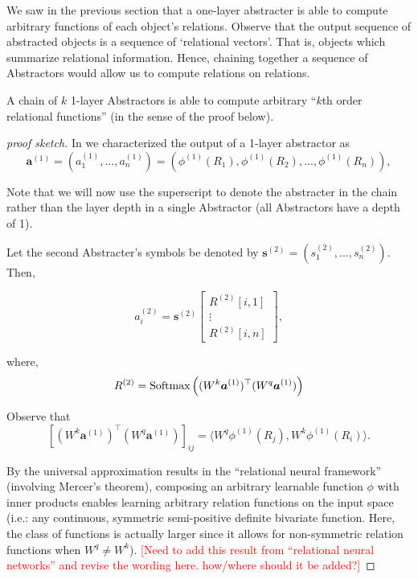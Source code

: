 We saw in the previous section that a one-layer abstracter is able to compute arbitrary functions  of each object's relations. Observe that the output sequence of abstracted objects is a sequence of `relational vectors'. That is, objects which summarize relational information. Hence, chaining together a sequence of Abstractors would allow us to compute relations on relations. 

\begin{lemma}
	\label{lemma:function_class_composed_abstractors}
	A chain of $k$ 1-layer Abstractors is able to compute arbitrary ``$k$th order relational functions'' (in the sense of the proof below).
\end{lemma}
\begin{proof}[proof sketch]
	In  we characterized the output of a 1-layer abstractor as
	\begin{equation*}
		\boldsymbol{a}^{(1)} = (a_1^{(1)}, ..., a_n^{(1)}) = \left(\phi^{(1)}(R_1), \phi^{(1)}(R_2), ..., \phi^{(1)}(R_n)\right),
	\end{equation*}
	
	Note that we will now use the superscript to denote the abstracter in the chain rather than the layer depth in a single Abstractor (all Abstractors have a depth of 1). 
	
	Let the second Abstracter's symbols be denoted by $\boldsymbol{s}^{(2)} = (s_1^{(2)}, ..., s_n^{(2)})$. Then, 
	
	\begin{equation*}
		a_i^{(2)} = \boldsymbol{s}^{(2)} \begin{bmatrix}R^{(2)}[i,1] \\ \vdots \\ R^{(2)}[i,n]\end{bmatrix},
	\end{equation*}
	
	where,
	\begin{equation*}
		R^{(2)} = \Softmax\left((W^k \boldsymbol{a}^{(1)})^\top (W^q \boldsymbol{a}^{(1)})\right)
	\end{equation*}
	
	Observe that 
	\begin{equation*}
		\left[(W^k \boldsymbol{a}^{(1)})^\top (W^q \boldsymbol{a}^{(1)})\right]_{ij} = \langle W^q \phi^{(1)}(R_j), W^k \phi^{(1)}(R_i) \rangle.
	\end{equation*}
	
	By the universal approximation results in the ``relational neural framework'' (involving Mercer's theorem), composing an arbitrary learnable function $\phi$ with inner products enables learning arbitrary relation functions on the input space (i.e.: any continuous, symmetric semi-positive definite bivariate function. Here, the class of functions is actually larger since it allows for non-symmetric relation functions when $W^q \neq W^k$). \textcolor{red}{[Need to add this result from ``relational neural networks'' and revise the wording here. how/where should it be added?]}
	

\end{proof}
